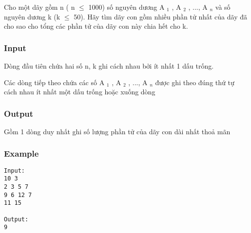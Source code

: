 



   Cho một dãy gồm n ( n  $\le$  1000) số nguyên dương A   $_    1   $   , A   $_    2   $   , ..., A   $_    n   $   và số nguyên dương k (k  $\le$  50). Hãy tìm dãy con gồm nhiều phần tử nhất của dãy đã cho sao cho tổng các phần tử của dãy con này chia hết cho k.  

\subsubsection{   Input  }

   Dòng đầu tiên chứa hai số n, k ghi cách nhau bởi ít nhất 1 dấu trống.  

   Các dòng tiếp theo chứa các số A   $_    1   $   , A   $_    2   $   , ..., A   $_    n   $   được ghi theo đúng thứ tự cách nhau ít nhất một dấu trống hoặc xuống dòng  

\subsubsection{   Output  }

   Gồm 1 dòng duy nhất ghi số lượng phần tử của dãy con dài nhất thoả mãn  

\subsubsection{   Example  }
\begin{verbatim}
Input:
10 3
2 3 5 7
9 6 12 7
11 15

Output:
9
\end{verbatim}
